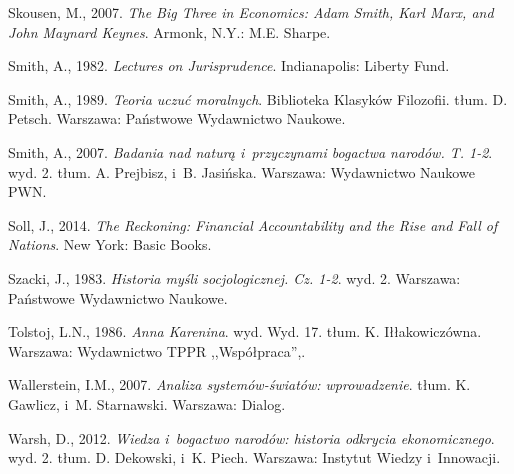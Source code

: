 Skousen, M., 2007. \textit{The Big Three in Economics: Adam Smith, Karl Marx, and John Maynard Keynes}. Armonk, N.Y.: M.E. Sharpe.

Smith, A., 1982. \textit{Lectures on Jurisprudence}. Indianapolis: Liberty Fund.

Smith, A., 1989. \textit{Teoria uczuć moralnych}. Biblioteka Klasyków Filozofii. tłum. D. Petsch. Warszawa: Państwowe Wydawnictwo Naukowe.

Smith, A., 2007. \textit{Badania nad naturą i~przyczynami bogactwa narodów. T. 1-2}. wyd. 2. tłum. A. Prejbisz, i~B. Jasińska. Warszawa: Wydawnictwo Naukowe PWN.

Soll, J., 2014. \textit{The Reckoning: Financial Accountability and the Rise and Fall of Nations}. New York: Basic Books.

Szacki, J., 1983. \textit{Historia myśli socjologicznej. Cz. 1-2}. wyd. 2. Warszawa: Państwowe Wydawnictwo Naukowe.

Tolstoj, L.N., 1986. \textit{Anna Karenina}. wyd. Wyd. 17. tłum. K. Iłłakowiczówna. Warszawa: Wydawnictwo TPPR ,,Współpraca'',.

Wallerstein, I.M., 2007. \textit{Analiza systemów-światów: wprowadzenie}. tłum. K. Gawlicz, i~M. Starnawski. Warszawa: Dialog.

Warsh, D., 2012. \textit{Wiedza i~bogactwo narodów: historia odkrycia ekonomicznego}. wyd. 2. tłum. D. Dekowski, i~K. Piech. Warszawa: Instytut Wiedzy i~Innowacji.

